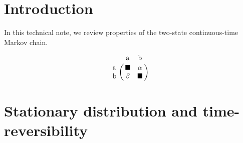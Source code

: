 \documentclass{article}
\providecommand{\Ao}{\text{a}}
\providecommand{\Bo}{\text{b}}
\providecommand{\Pa}{\alpha}
\providecommand{\Pb}{\beta}
\providecommand{\bs}{\blacksquare}
\begin{document}

\section{Introduction}

In this technical note, we review properties of the two-state continuous-time
Markov chain.

\begin{equation}
\bordermatrix{
	    & \Ao  & \Bo  \cr
	\Ao & \bs  & \Pa \cr
	\Bo & \Pb & \bs  \cr
}
\end{equation}

\section{Stationary distribution and time-reversibility}
\end{document}
